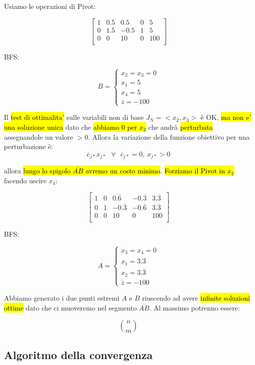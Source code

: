 Usiamo le operazioni di Pivot:

$$
\left[ {\begin{array}{ccccc}
	1 & 0.5 & 0.5 & 0 & 5\\
	0 & 1.5 & -0.5 & 1 & 5\\
	0 & 0 & 10 & 0 & 100\\
\end{array} } \right]
$$

BFS:

$$B =
\begin{cases} 
    x_2 = x_3 = 0 \\ 
    x_1 = 5 \\
	x_4 = 5 \\
	\overline{z} = -100
\end{cases}
$$

Il \hl{test di ottimalita'} sulle variabili non di base $J_N = <x_2, x_3>$ è OK, \hl{ma non e' una soluzione unica} dato che \hl{abbiamo $0$ per $x_2$} che andrà \hl{perturbata} assegnandole un valore $> 0$. Allora la variazione della funzione obiettivo per una perturbazione è:
$$\overline{c}_{j*}x_{j*}\ \ \ \forall\ \ \ \overline{c}_{j*}=0,\ x_{j*} > 0$$

allora \hl{lungo lo spigolo $\overline{AB}$ avremo un costo minimo}. \hl{Forziamo il Pivot in $x_2$} facendo uscire $x_4$:

$$
\left[ {\begin{array}{ccccc}
	1 & 0 & 0.\overline{6} & -0.\overline{3} & 3.\overline{3}\\
	0 & 1 & -0.\overline{3} & -0.\overline{6} & 3.\overline{3}\\
	0 & 0 & 10 & 0 & 100\\
\end{array} } \right]
$$

BFS:


$$A =
\begin{cases} 
    x_3 = x_4 = 0 \\ 
    x_1 = 3.\overline{3} \\
	x_2 = 3.\overline{3} \\
	\overline{z} = -100
\end{cases}
$$

Abbiamo generato i due punti estremi $A$ e $B$ riuscendo ad avere \hl{infinite soluzioni ottime} dato che ci muoveremo nel segmento $\overline{AB}$. Al massimo potrenno essere:

$$\binom{n}{m}$$ 


\subsection{Algoritmo della convergenza}

